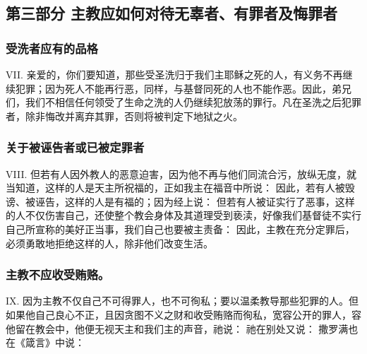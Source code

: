 
\subsection{第三部分  主教应如何对待无辜者、有罪者及悔罪者}


\subsubsection{受洗者应有的品格}

VII. 亲爱的，你们要知道，那些受圣洗归于我们主耶稣之死的人，有义务不再继续犯罪；因为死人不能再行恶，同样，与基督同死的人也不能作恶。因此，弟兄们，我们不相信任何领受了生命之洗的人仍继续犯放荡的罪行。凡在圣洗之后犯罪者，除非悔改并离弃其罪，否则将被判定下地狱之火。\par


\subsubsection{关于被诬告者或已被定罪者}

VIII. 但若有人因外教人的恶意迫害，因为他不再与他们同流合污，放纵无度，就当知道，这样的人是天主所祝福的，正如我主在福音中所说： 因此，若有人被毁谤、被诬告，这样的人是有福的；因为经上说： 但若有人被证实行了恶事，这样的人不仅伤害自己，还使整个教会身体及其道理受到亵渎，好像我们基督徒不实行自己所宣称的美好正当事，我们自己也要被主责备： 因此，主教在充分定罪后，必须勇敢地拒绝这样的人，除非他们改变生活。\par


\subsubsection{主教不应收受贿赂。}

IX. 因为主教不仅自己不可得罪人，也不可徇私；要以温柔教导那些犯罪的人。但如果他自己良心不正，且因贪图不义之财和收受贿赂而徇私，宽容公开的罪人，容他留在教会中，他便无视天主和我们主的声音，祂说： 祂在别处又说： 撒罗满也在《箴言》中说：\par

